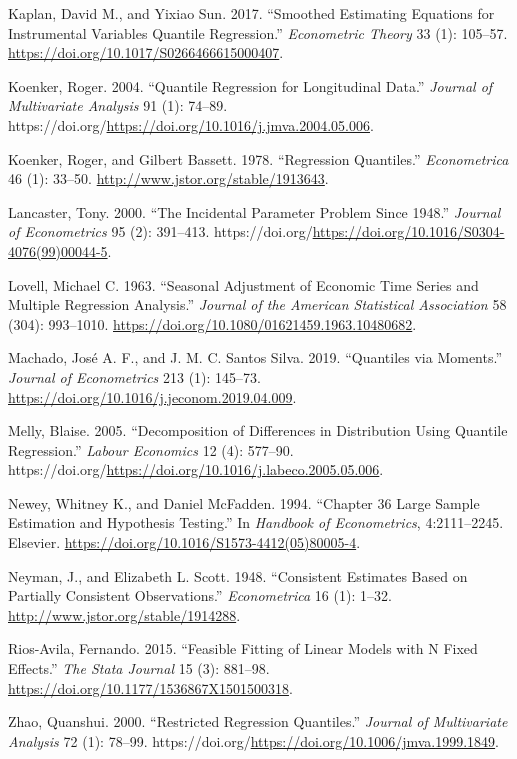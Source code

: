 \documentclass[
  letterpaper,
  DIV=11,
  numbers=noendperiod]{scrartcl}
\newlength{\cslhangindent}
\newlength{\cslentryspacingunit} %
\newenvironment{CSLReferences}[2] %
 {%
  \setlength{\parindent}{0pt}
  \ifodd #1
  \let\oldpar\par
  \def\par{\hangindent=\cslhangindent\oldpar}
  \fi
  \setlength{\parskip}{#2\cslentryspacingunit}
 }%
 {}
\begin{document}
\begin{CSLReferences}{1}{0}
\leavevmode{}%
Kaplan, David M., and Yixiao Sun. 2017. {``Smoothed Estimating Equations
for Instrumental Variables Quantile Regression.''} \emph{Econometric
Theory} 33 (1): 105--57.
\url{https://doi.org/10.1017/S0266466615000407}.

\leavevmode{}%
Koenker, Roger. 2004. {``Quantile Regression for Longitudinal Data.''}
\emph{Journal of Multivariate Analysis} 91 (1): 74--89.
https://doi.org/\url{https://doi.org/10.1016/j.jmva.2004.05.006}.

\leavevmode{}%
Koenker, Roger, and Gilbert Bassett. 1978. {``Regression Quantiles.''}
\emph{Econometrica} 46 (1): 33--50.
\url{http://www.jstor.org/stable/1913643}.

\leavevmode{}%
Lancaster, Tony. 2000. {``The Incidental Parameter Problem Since
1948.''} \emph{Journal of Econometrics} 95 (2): 391--413.
https://doi.org/\url{https://doi.org/10.1016/S0304-4076(99)00044-5}.

\leavevmode{}%
Lovell, Michael C. 1963. {``Seasonal Adjustment of Economic Time Series
and Multiple Regression Analysis.''} \emph{Journal of the American
Statistical Association} 58 (304): 993--1010.
\url{https://doi.org/10.1080/01621459.1963.10480682}.

\leavevmode{}%
Machado, José A. F., and J. M. C. Santos Silva. 2019. {``Quantiles via
Moments.''} \emph{Journal of Econometrics} 213 (1): 145--73.
\url{https://doi.org/10.1016/j.jeconom.2019.04.009}.

\leavevmode{}%
Melly, Blaise. 2005. {``Decomposition of Differences in Distribution
Using Quantile Regression.''} \emph{Labour Economics} 12 (4): 577--90.
https://doi.org/\url{https://doi.org/10.1016/j.labeco.2005.05.006}.

\leavevmode{}%
Newey, Whitney K., and Daniel McFadden. 1994. {``Chapter 36 {Large}
Sample Estimation and Hypothesis Testing.''} In \emph{Handbook of
{Econometrics}}, 4:2111--2245. Elsevier.
\url{https://doi.org/10.1016/S1573-4412(05)80005-4}.

\leavevmode{}%
Neyman, J., and Elizabeth L. Scott. 1948. {``Consistent Estimates Based
on Partially Consistent Observations.''} \emph{Econometrica} 16 (1):
1--32. \url{http://www.jstor.org/stable/1914288}.

\leavevmode{}%
Rios-Avila, Fernando. 2015. {``Feasible {Fitting} of {Linear} {Models}
with {N} {Fixed} {Effects}.''} \emph{The Stata Journal} 15 (3): 881--98.
\url{https://doi.org/10.1177/1536867X1501500318}.

\leavevmode{}%
Zhao, Quanshui. 2000. {``Restricted {Regression} {Quantiles}.''}
\emph{Journal of Multivariate Analysis} 72 (1): 78--99.
https://doi.org/\url{https://doi.org/10.1006/jmva.1999.1849}.

\end{CSLReferences}
\end{document}
